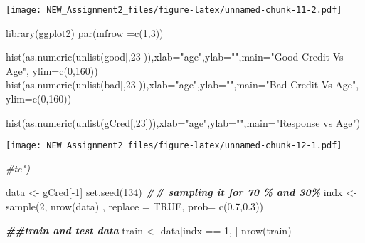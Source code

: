 \documentclass[
]{article}
\newenvironment{Shaded}{\begin{snugshade}}{\end{snugshade}}
\newcommand{\AttributeTok}[1]{\textcolor[rgb]{0.77,0.63,0.00}{#1}}
\newcommand{\CommentTok}[1]{\textcolor[rgb]{0.56,0.35,0.01}{\textit{#1}}}
\newcommand{\ConstantTok}[1]{\textcolor[rgb]{0.00,0.00,0.00}{#1}}
\newcommand{\DecValTok}[1]{\textcolor[rgb]{0.00,0.00,0.81}{#1}}
\newcommand{\DocumentationTok}[1]{\textcolor[rgb]{0.56,0.35,0.01}{\textbf{\textit{#1}}}}
\newcommand{\FloatTok}[1]{\textcolor[rgb]{0.00,0.00,0.81}{#1}}
\newcommand{\FunctionTok}[1]{\textcolor[rgb]{0.00,0.00,0.00}{#1}}
\newcommand{\NormalTok}[1]{#1}
\newcommand{\OtherTok}[1]{\textcolor[rgb]{0.56,0.35,0.01}{#1}}
\newcommand{\SpecialCharTok}[1]{\textcolor[rgb]{0.00,0.00,0.00}{#1}}
\newcommand{\StringTok}[1]{\textcolor[rgb]{0.31,0.60,0.02}{#1}}
\begin{document}
\texttt{[image: NEW\_Assignment2\_files/figure-latex/unnamed-chunk-11-2.pdf]}

\begin{Shaded}
\begin{Highlighting}[]
\FunctionTok{library}\NormalTok{(ggplot2)}
\FunctionTok{par}\NormalTok{(}\AttributeTok{mfrow =}\FunctionTok{c}\NormalTok{(}\DecValTok{1}\NormalTok{,}\DecValTok{3}\NormalTok{))}

\FunctionTok{hist}\NormalTok{(}\FunctionTok{as.numeric}\NormalTok{(}\FunctionTok{unlist}\NormalTok{(good[,}\DecValTok{23}\NormalTok{])),}\AttributeTok{xlab=}\StringTok{"age"}\NormalTok{,}\AttributeTok{ylab=}\StringTok{""}\NormalTok{,}\AttributeTok{main=}\StringTok{"Good Credit Vs Age"}\NormalTok{,}
     \AttributeTok{ylim=}\FunctionTok{c}\NormalTok{(}\DecValTok{0}\NormalTok{,}\DecValTok{160}\NormalTok{))}
\FunctionTok{hist}\NormalTok{(}\FunctionTok{as.numeric}\NormalTok{(}\FunctionTok{unlist}\NormalTok{(bad[,}\DecValTok{23}\NormalTok{])),}\AttributeTok{xlab=}\StringTok{"age"}\NormalTok{,}\AttributeTok{ylab=}\StringTok{""}\NormalTok{,}\AttributeTok{main=}\StringTok{"Bad Credit Vs Age"}\NormalTok{,}
     \AttributeTok{ylim=}\FunctionTok{c}\NormalTok{(}\DecValTok{0}\NormalTok{,}\DecValTok{160}\NormalTok{))}

\FunctionTok{hist}\NormalTok{(}\FunctionTok{as.numeric}\NormalTok{(}\FunctionTok{unlist}\NormalTok{(gCred[,}\DecValTok{23}\NormalTok{])),}\AttributeTok{xlab=}\StringTok{"age"}\NormalTok{,}\AttributeTok{ylab=}\StringTok{""}\NormalTok{,}\AttributeTok{main=}\StringTok{"Response vs Age"}\NormalTok{)}
\end{Highlighting}
\end{Shaded}

\texttt{[image: NEW\_Assignment2\_files/figure-latex/unnamed-chunk-12-1.pdf]}

\begin{Shaded}
\begin{Highlighting}[]
\CommentTok{\#te")}
\end{Highlighting}
\end{Shaded}

\begin{Shaded}
\begin{Highlighting}[]
\NormalTok{data }\OtherTok{\textless{}{-}}\NormalTok{ gCred[}\SpecialCharTok{{-}}\DecValTok{1}\NormalTok{]}
\FunctionTok{set.seed}\NormalTok{(}\DecValTok{134}\NormalTok{)}
\DocumentationTok{\#\# sampling it for 70 \% and 30\%}
\NormalTok{indx }\OtherTok{\textless{}{-}} \FunctionTok{sample}\NormalTok{(}\DecValTok{2}\NormalTok{, }\FunctionTok{nrow}\NormalTok{(data) , }\AttributeTok{replace =} \ConstantTok{TRUE}\NormalTok{, }\AttributeTok{prob=} \FunctionTok{c}\NormalTok{(}\FloatTok{0.7}\NormalTok{,}\FloatTok{0.3}\NormalTok{)) }

\DocumentationTok{\#\#train and test data}
\NormalTok{train }\OtherTok{\textless{}{-}}\NormalTok{ data[indx }\SpecialCharTok{==} \DecValTok{1}\NormalTok{, ]}
\FunctionTok{nrow}\NormalTok{(train)}
\end{Highlighting}
\end{Shaded}
\end{document}
